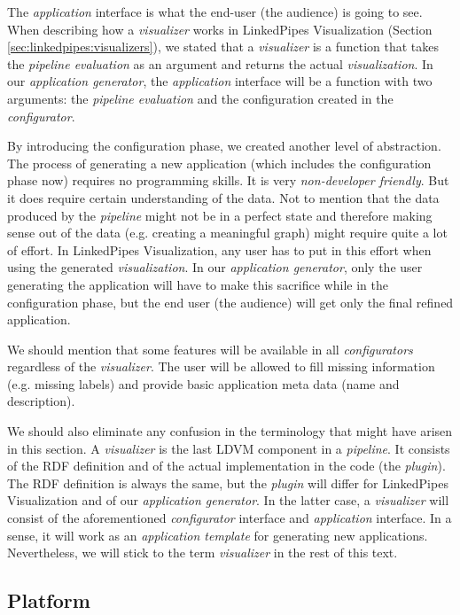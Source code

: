 The \emph{application} interface is what the end-user (the audience) is going to see. When describing how a \emph{visualizer} works in LinkedPipes Visualization (Section \ref{sec:linkedpipes:visualizers}), we stated that a \emph{visualizer} is a function that takes the \emph{pipeline evaluation} as an argument and returns the actual \emph{visualization}. In our \emph{application generator}, the \emph{application} interface will be a function with two arguments: the \emph{pipeline evaluation} and the configuration created in the \emph{configurator}.

By introducing the configuration phase, we created another level of abstraction. The process of generating a new application (which includes the configuration phase now) requires no programming skills. It is very \emph{non-developer friendly}. But it does require certain understanding of the data. Not to mention that the data produced by the \emph{pipeline} might not be in a perfect state and therefore making sense out of the data (e.g. creating a meaningful graph) might require quite a lot of effort. In LinkedPipes Visualization, any user has to put in this effort when using the generated \emph{visualization}. In our \emph{application generator}, only the user generating the application will have to make this sacrifice while in the configuration phase, but the end user (the audience) will get only the final refined application.

We should mention that some features will be available in all \emph{configurators} regardless of the \emph{visualizer}. The user will be allowed to fill missing information (e.g. missing labels) and provide basic application meta data (name and description).

We should also eliminate any confusion in the terminology that might have arisen in this section. A \emph{visualizer} is the last LDVM component in a \emph{pipeline}. It consists of the RDF definition and of the actual implementation in the code (the \emph{plugin}). The RDF definition is always the same, but the  \emph{plugin} will differ for LinkedPipes Visualization and of our \emph{application generator}. In the latter case, a \emph{visualizer} will consist of the aforementioned \emph{configurator} interface and \emph{application} interface. In a sense, it will work as an \emph{application template} for generating new applications. Nevertheless, we will stick to the term \emph{visualizer} in the rest of this text.

\subsection{Platform}

